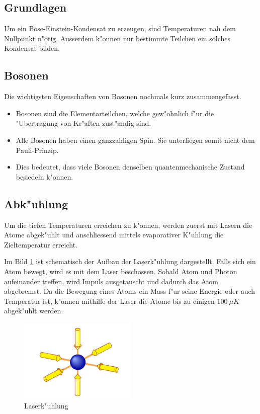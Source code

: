 \begin{refsection}
\section{Grundlagen}

Um ein Bose-Einstein-Kondensat zu erzeugen, sind Temperaturen nah dem Nullpunkt n"otig. Ausserdem k"onnen nur bestimmte Teilchen ein solches Kondensat bilden.

\subsection{Bosonen}

Die wichtigsten Eigenschaften von Bosonen nochmals kurz zusammengefasst.

\begin{itemize}
    \item	Bosonen sind die Elementarteilchen, welche gew"ohnlich f"ur die
            "Ubertragung von Kr"aften zust"andig sind.	 
    \item	Alle Bosonen haben einen ganzzahligen Spin. Sie unterliegen
            somit nicht dem Pauli-Prinzip.
    \item	Dies bedeutet, dass viele Bosonen denselben
            quantenmechanische Zustand besiedeln k"onnen.
\end{itemize}

\subsection{Abk"uhlung}

Um die tiefen Temperaturen erreichen zu k"onnen, werden zuerst mit Lasern die Atome abgek"uhlt und anschliessend mittels evaporativer K"uhlung die Zieltemperatur erreicht. 

Im Bild \ref{fig:LaserKuehlung} ist schematisch der Aufbau der Laserk"uhlung dargestellt.
Falls sich ein Atom bewegt, wird es mit dem Laser beschossen. Sobald Atom und Photon aufeinander treffen, wird Impuls ausgetauscht und dadurch das Atom abgebremst.
Da die Bewegung eines Atoms ein Mass f"ur seine Energie oder auch Temperatur ist, k"onnen mithilfe der Laser die Atome bis zu einigen $100~\mu K$  abgek"uhlt werden. \cite{bose:LaserKuehlung}

\begin{figure}
	\centering
	\includegraphics[width = 0.5\textwidth]{./bose/laserkuehlung.png} 
	\caption[Laserk"uhlung]{Laserk"uhlung \cite{bose:WikiLaserKuehl}}
	\label{fig:LaserKuehlung}
\end{figure}


\end{refsection}

